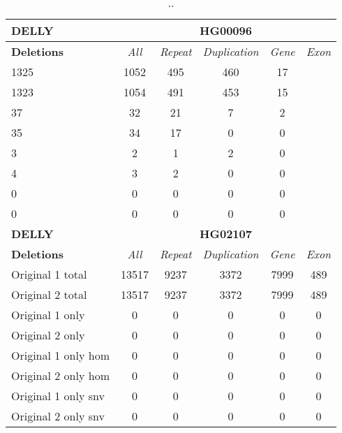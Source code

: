 \begin{table}[htb]
\begin{center}
\begin{tabular}{|l|c||c|c|c|c|}
\hline
{\bf DELLY} & \multicolumn{5}{|c|}{\bf HG00096} \\
\hline
\cline{2-6}
{\bf Deletions} & {\it All} & {\it Repeat} & {\it Duplication} & {\it Gene} & {\it Exon} \\
\hline
1325 & 1052 & 495 & 460 & 17\\ 
\hline
1323 & 1054 & 491 & 453 & 15\\ 
\hline
37 & 32 & 21 & 7 & 2\\ 
\hline
35 & 34 & 17 & 0 & 0\\ 
\hline
3 & 2 & 1 & 2 & 0\\ 
\hline
4 & 3 & 2 & 0 & 0\\ 
\hline
0 & 0 & 0 & 0 & 0\\ 
\hline
0 & 0 & 0 & 0 & 0\\ 
\hline
\hline
{\bf DELLY} & \multicolumn{5}{|c|}{\bf HG02107} \\
\hline
\cline{2-6}
{\bf Deletions} & {\it All} & {\it Repeat} & {\it Duplication} & {\it Gene} & {\it Exon} \\
\hline
Original 1 total & 13517 & 9237 & 3372 & 7999 & 489\\ 
\hline
Original 2 total & 13517 & 9237 & 3372 & 7999 & 489\\ 
\hline
Original 1 only & 0 & 0 & 0 & 0 & 0\\ 
\hline
Original 2 only & 0 & 0 & 0 & 0 & 0\\ 
\hline
Original 1 only hom & 0 & 0 & 0 & 0 & 0\\ 
\hline
Original 2 only hom & 0 & 0 & 0 & 0 & 0\\ 
\hline
Original 1 only snv & 0 & 0 & 0 & 0 & 0\\ 
\hline
Original 2 only snv & 0 & 0 & 0 & 0 & 0\\ 
\hline
\end{tabular}
\end{center}
\caption{ .. }
\label{tab:orig-vs-shuf-delly-deletions}
\end{table}

